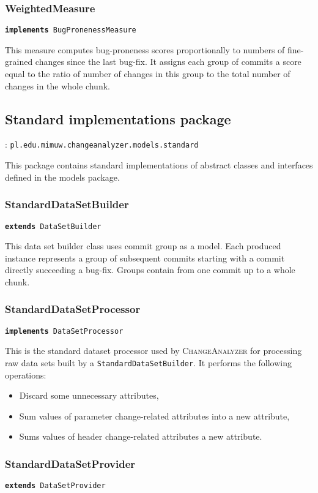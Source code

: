 \documentclass{pracamgr}
\newcommand{\ca}{\textsc{ChangeAnalyzer}\xspace}
\newcommand{\pack}[3]{\subsection{#1 package} \label{sec:#2} \underline{\smash{Full package name}}: \texttt{#3}\medskip}
\newcommand{\extends}[1]{\vspace{-0.5em}\hspace{\parindent}\texttt{\textbf{extends} #1}\vspace{0.5em}}
\newcommand{\implements}[1]{\vspace{-0.5em}\hspace{\parindent}\texttt{\textbf{implements} #1}\vspace{0.5em}}
\begin{document}
\subsubsection*{WeightedMeasure}
\implements{BugPronenessMeasure}

\noindent This measure computes bug-proneness scores proportionally to numbers of fine-grained changes since the last bug-fix. It assigns each group of commits a score equal to the ratio of number of changes in this group to the total number of changes in the whole chunk.

\pack{Standard implementations}{standard}{pl.edu.mimuw.changeanalyzer.models.standard}

\noindent This package contains standard implementations of abstract classes and interfaces defined in the models package.

\subsubsection*{StandardDataSetBuilder}
\extends{DataSetBuilder}

\noindent This data set builder class uses commit group as a model. Each produced instance represents a group of subsequent commits starting with a commit directly succeeding a bug-fix. Groups contain from one commit up to a whole chunk.

\subsubsection*{StandardDataSetProcessor}
\implements{DataSetProcessor}

\noindent This is the standard dataset processor used by \ca for processing raw data sets built by a \texttt{StandardDataSetBuilder}. It performs the following operations:
\begin{itemize}[noitemsep,topsep=1pt]
	\item Discard some unnecessary attributes,
	\item Sum values of parameter change-related attributes into a new attribute,
	\item Sums values of header change-related attributes a new attribute.
\end{itemize}

\subsubsection*{StandardDataSetProvider}
\extends{DataSetProvider}
\end{document}
